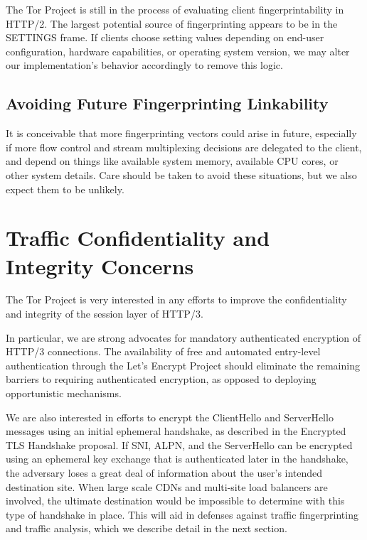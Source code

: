 \documentclass[letterpaper,11pt]{llncs}
\begin{document}
The Tor Project is still in the process of evaluating client
fingerprintability in HTTP/2. The largest potential source of fingerprinting
appears to be in the SETTINGS frame. If clients choose setting values
depending on end-user configuration, hardware capabilities, or operating
system version, we may alter our implementation's behavior accordingly to
remove this logic.

\subsection{Avoiding Future Fingerprinting Linkability}

It is conceivable that more fingerprinting vectors could arise in future,
especially if more flow control and stream multiplexing decisions are
delegated to the client, and depend on things like available system memory,
available CPU cores, or other system details. Care should be taken to avoid
these situations, but we also expect them to be unlikely.

\section{Traffic Confidentiality and Integrity Concerns}

The Tor Project is very interested in any efforts to improve the
confidentiality and integrity of the session layer of HTTP/3. 

In particular, we are strong advocates for mandatory authenticated encryption
of HTTP/3 connections.  The availability of free and automated entry-level
authentication through the Let's Encrypt Project\cite{lets-encrypt} should
eliminate the remaining barriers to requiring authenticated encryption, as
opposed to deploying opportunistic mechanisms.

We are also interested in efforts to encrypt the ClientHello and ServerHello
messages using an initial ephemeral handshake, as described in the Encrypted
TLS Handshake proposal\cite{encrypted-handshake}. If SNI, ALPN, and the
ServerHello can be encrypted using an ephemeral key exchange that is
authenticated later in the handshake, the adversary loses a great deal of
information about the user's intended destination site. When large scale CDNs
and multi-site load balancers are involved, the ultimate destination would be
impossible to determine with this type of handshake in place. This will aid in
defenses against traffic fingerprinting and traffic analysis, which we
describe detail in the next section.
\end{document}
